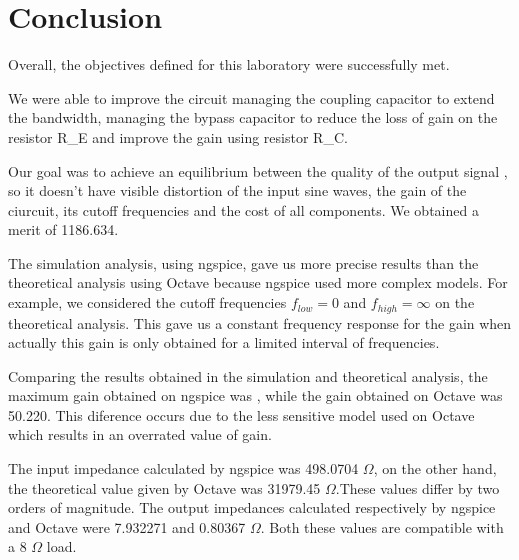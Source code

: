 \section{Conclusion}
\label{sec:conclusion}


Overall, the objectives defined for this laboratory were successfully met.


We were able to improve the circuit managing the coupling capacitor to extend the bandwidth, managing the bypass capacitor to reduce the loss of gain on the resistor R_E and improve the gain using resistor R_C.



Our goal was to achieve an equilibrium between the quality of the output signal , so it doesn't have visible distortion of the input sine waves, the gain of the ciurcuit, its cutoff frequencies and the cost of all components. We obtained a merit of 1186.634.



The simulation analysis, using ngspice, gave us more precise results than the theoretical analysis using Octave because ngspice used more complex models. For example, we considered the cutoff frequencies $f_{low}=0$ and $f_{high}=\infty$ on the theoretical analysis. This gave us a constant frequency response for the gain when actually this gain is only obtained for a limited interval of frequencies. 


Comparing the results obtained in the simulation and theoretical analysis, the maximum gain obtained on ngspice was , while the gain obtained on Octave was 50.220. This diference occurs due to the less sensitive model used on Octave which results  in an overrated value of gain. 


The input impedance calculated by ngspice was 498.0704 $\Omega$, on the other hand, the theoretical value  given by Octave was 31979.45 $\Omega$.These values differ by two orders of magnitude. The output impedances calculated respectively by ngspice and Octave were 7.932271 and 0.80367 $\Omega$. Both these values are compatible with a 8 $\Omega$ load. 


